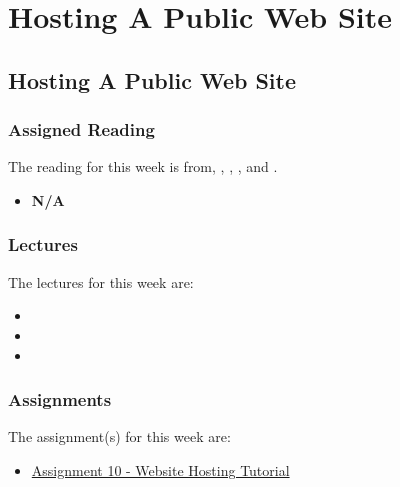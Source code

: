 \clearpage

\renewcommand{\ChapTitle}{Hosting A Public Web Site}
\renewcommand{\SectionTitle}{Hosting A Public Web Site}

\chapter{\ChapTitle}

\section{\SectionTitle}

\subsection{Assigned Reading}

The reading for this week is from, \AgileBook, \EngSoftBook, \ProGitBook, and \LinuxBook.

\begin{itemize}
    \item \textbf{N/A}
\end{itemize}

\subsection{Lectures}

The lectures for this week are:

\begin{itemize}
    \item {}
    \item {}
    \item {}
\end{itemize}

\subsection{Assignments}

The assignment(s) for this week are:

\begin{itemize}
    \item \href{https://github.com/QuantumCompiler/CU/tree/main/CSPB%203308%20-%20Software%20Development%20Methods%20And%20Tools/Assignments/Assignment%2010%20-%20Web%20Site%20Hosting%20Tutorial}{Assignment 10 - Website Hosting Tutorial}
\end{itemize}

